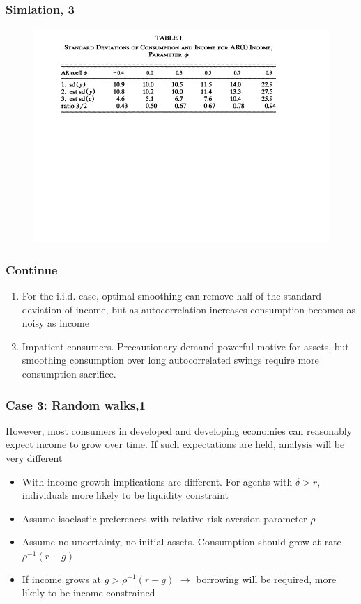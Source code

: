 \documentclass[mathserif]{beamer}
\begin{document}
\begin{frame}
\frametitle{Simlation, 3}
\begin{figure}
\includegraphics[height=2.5 in, scale = 0.5]{table1.jpg}
\end{figure}
\end{frame}

\begin{frame}
\frametitle{Continue}
\begin{enumerate}
  \item For the i.i.d. case, optimal smoothing can remove half of the standard deviation of income, but as autocorrelation increases consumption becomes as noisy as income
  \item Impatient consumers. Precautionary demand powerful motive for assets, but smoothing consumption over long autocorrelated swings require more consumption sacrifice.
\end{enumerate}
\end{frame}

\begin{frame}
\frametitle{Case 3: Random walks,1}
However, most consumers in developed and developing economies can reasonably expect income to grow over time. If such expectations are held, analysis will be very different 

\begin{itemize}
  \item  With income growth implications are different. For agents with \(\delta > r\), individuals more likely to be liquidity constraint
  \item Assume isoelastic preferences with relative risk aversion parameter $\rho$
  \item Assume no uncertainty, no initial assets. Consumption should grow at rate \(\rho^{-1} (r-g)\)
  \item If income grows at \(g > \rho^{-1} (r-g)\) $\rightarrow$ borrowing will be required, more likely to be income constrained
\end{itemize}
\end{frame}
\end{document}
